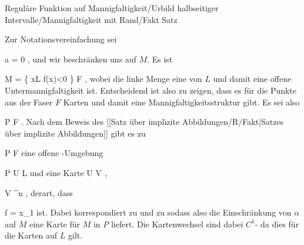 {Reguläre Funktion auf Mannigfaltigkeit/Urbild halbseitiger Intervalle/Mannigfaltigkeit mit Rand/Fakt}
{Satz}
{}
{

\faktzusatz {}
\faktzusatz {}

}
{

Zur Notationsvereinfachung sei

\mavergleichskette
{\vergleichskette
{ a
}
{ = }{ 0
}
{  }{
}
{    }{
}
{   }{
}
}
{}{}{,}
und wir beschränken uns auf $M$. Es ist

\mavergleichskettedisp
{\vergleichskette
{ M
}
{ =} { \left\{  x\in L  \mid  f(x)<0        \right\}  \uplus F
}
{ } {
}
{ } {
}
{ } {
}
}
{}{}{,}
wobei die linke Menge eine
von $L$ und damit eine offene Untermannigfaltigkeit ist. Entscheidend ist also zu zeigen, dass es für die Punkte aus der Faser $F$ Karten und damit eine Mannigfaltigkeitsstruktur gibt. Es sei also

\mavergleichskette
{\vergleichskette
{ P
}
{ \in }{ F
}
{  }{
}
{    }{
}
{   }{
}
}
{}{}{.}
Nach dem Beweis
des [[Satz über implizite Abbildungen/R/Fakt|Satzes über implizite Abbildungen]]
gibt es zu

\mavergleichskette
{\vergleichskette
{ P
}
{ \in }{ F
}
{  }{
}
{    }{
}
{   }{
}
}
{}{}{}
eine offene
 {} {-}Umgebung

\mavergleichskette
{\vergleichskette
{ P
}
{ \in }{ U
}
{ \subseteq }{ L
}
{    }{
}
{   }{
}
}
{}{}{}
und eine Karte
\maabbdisp {\alpha} { U } { V
} {,}

\mavergleichskette
{\vergleichskette
{ V
}
{ \subseteq }{ \R^n
}
{  }{
}
{    }{
}
{   }{
}
}
{}{}{,}
derart, dass

\mavergleichskette
{\vergleichskette
{ f
}
{ = }{ x_1 \circ \alpha
}
{  }{
}
{    }{
}
{   }{
}
}
{}{}{}
ist. Dabei korrespondiert
 zu
 und
 zu
 sodass also die Einschränkung von $\alpha$ auf $M$ eine Karte für $M$ in $P$ liefert. Die Kartenwechsel sind dabei
$C^1$-
da dies für die
 {} {}
Karten auf $L$ gilt.

}

